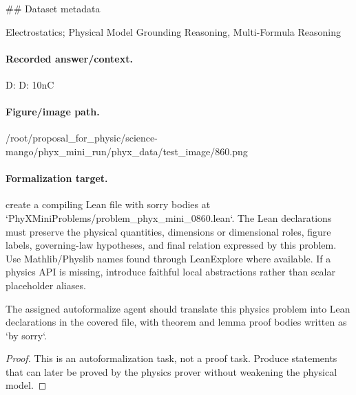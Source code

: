\#\# Dataset metadata

Electrostatics; Physical Model Grounding Reasoning, Multi-Formula Reasoning

\paragraph{Recorded answer/context.}
D: D: 10nC

\paragraph{Figure/image path.}
/root/proposal\_for\_physic/science-mango/phyx\_mini\_run/phyx\_data/test\_image/860.png

\paragraph{Formalization target.}
create a compiling Lean file with sorry bodies at `PhyXMiniProblems/problem\_phyx\_mini\_0860.lean`. The Lean declarations must preserve the physical quantities, dimensions or dimensional roles, figure labels, governing-law hypotheses, and final relation expressed by this problem.
Use Mathlib/Physlib names found through LeanExplore where available. If a physics API is missing, introduce faithful local abstractions rather than scalar placeholder aliases.

\begin{theorem}
\label{thm:physics:phyx_mini_0860:target}
The assigned autoformalize agent should translate this physics problem into Lean declarations in the covered file, with theorem and lemma proof bodies written as `by sorry`.
\end{theorem}
\begin{proof}
This is an autoformalization task, not a proof task. Produce statements that can later be proved by the physics prover without weakening the physical model.
\end{proof}

